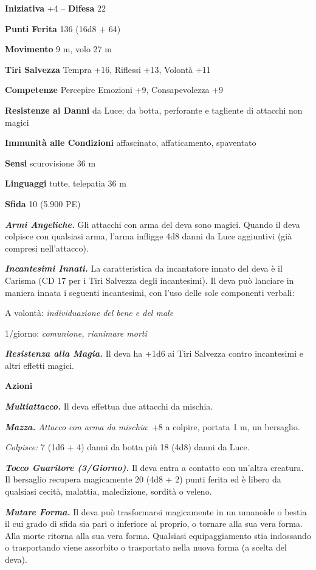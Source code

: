 \begin{multicols}{2}
\textbf{Iniziativa} +4 -- \textbf{Difesa} 22

\textbf{Punti Ferita} 136 (16d8 + 64)

\textbf{Movimento} 9 m, volo 27 m

\textbf{Tiri Salvezza} Tempra +16, Riflessi +13, Volontà +11

\textbf{Competenze} Percepire Emozioni +9, Consapevolezza +9

\textbf{Resistenze ai Danni} da Luce; da botta, perforante e tagliente di attacchi non magici

\textbf{Immunità alle Condizioni} affascinato, affaticamento, spaventato

\textbf{Sensi} scurovisione 36 m

\textbf{Linguaggi} tutte, telepatia 36 m

\textbf{Sfida} 10 (5.900 PE)

\emph{\textbf{Armi Angeliche.}} Gli attacchi con arma del deva sono magici. Quando il deva colpisce con qualsiasi arma, l'arma infligge 4d8 danni da Luce aggiuntivi (già compresi nell'attacco).

\emph{\textbf{Incantesimi Innati.}} La caratteristica da incantatore innato del deva è il Carisma (CD 17 per i Tiri Salvezza degli incantesimi). Il deva può lanciare in maniera innata i seguenti incantesimi, con l'uso delle sole componenti verbali: 

A volontà: \emph{individuazione del bene e del male}

1/giorno: \emph{comunione, rianimare morti}

\emph{\textbf{Resistenza alla Magia.}} Il deva ha +1d6 ai Tiri Salvezza contro incantesimi e altri effetti magici.

\textbf{Azioni}

\emph{\textbf{Multiattacco.}} Il deva effettua due attacchi da mischia.

\emph{\textbf{Mazza.} Attacco con arma da mischia}: +8 a colpire, portata 1 m, un bersaglio.

\emph{Colpisce:} 7 (1d6 + 4) danni da botta più 18 (4d8) danni da Luce.

\emph{\textbf{Tocco Guaritore (3/Giorno).}} Il deva entra a contatto con un'altra creatura. Il bersaglio recupera magicamente 20 (4d8 + 2) punti ferita ed è libero da qualsiasi cecità, malattia, maledizione, sordità o veleno.

\emph{\textbf{Mutare Forma.}} Il deva può trasformarsi magicamente in un umanoide o bestia il cui grado di sfida sia pari o inferiore al proprio, o tornare alla sua vera forma. Alla morte ritorna alla sua vera forma. Qualsiasi equipaggiamento stia indossando o trasportando viene assorbito o trasportato nella nuova forma (a scelta del deva).


\end{multicols}
